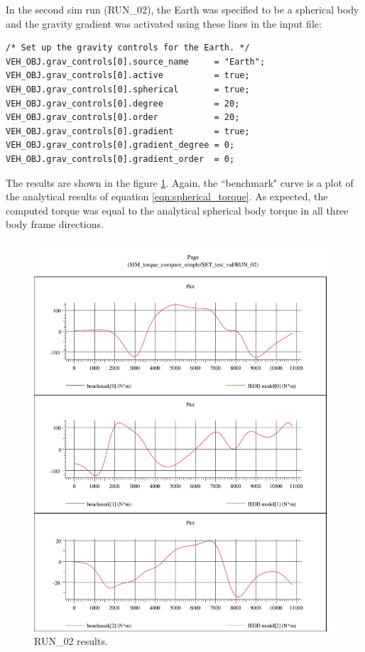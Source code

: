 In the second sim run (RUN\_02), the Earth was specified to be a
spherical body and the gravity gradient was activated using these 
lines in the input file:
\begin{verbatim}
/* Set up the gravity controls for the Earth. */
VEH_OBJ.grav_controls[0].source_name     = "Earth";
VEH_OBJ.grav_controls[0].active          = true;
VEH_OBJ.grav_controls[0].spherical       = true;
VEH_OBJ.grav_controls[0].degree          = 20;
VEH_OBJ.grav_controls[0].order           = 20;
VEH_OBJ.grav_controls[0].gradient        = true;
VEH_OBJ.grav_controls[0].gradient_degree = 0;
VEH_OBJ.grav_controls[0].gradient_order  = 0;
\end{verbatim}
The results are shown in the figure \ref{fig:run02_results}.
Again, the ``benchmark" curve is a plot of the analytical results of 
equation \ref{eqn:spherical_torque}.  As expected, the
computed torque was equal to the analytical spherical body
torque in all three body frame directions.
\begin{figure}[h!]
\centering
\includegraphics[width=6.1in]{figs/run_02.pdf}
\caption{RUN\_02 results.}
\label{fig:run02_results}
\end{figure}
\newpage

